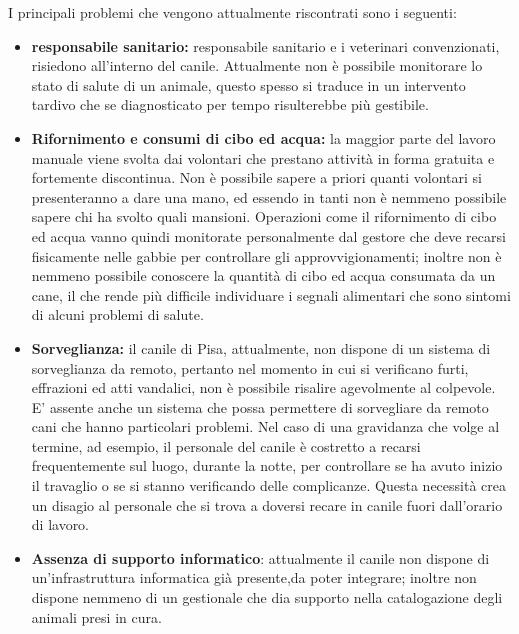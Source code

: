 I principali problemi che vengono attualmente riscontrati sono i seguenti:
\begin{itemize}
    \item \textbf{responsabile sanitario:} responsabile sanitario e i veterinari convenzionati, risiedono all'interno del canile.
    Attualmente non è possibile monitorare lo stato di salute di un animale, questo spesso si traduce in un intervento tardivo che se diagnosticato per tempo risulterebbe più gestibile.
    \item \textbf{Rifornimento e consumi di cibo ed acqua:} la maggior parte del lavoro manuale viene svolta dai volontari che prestano attività in forma gratuita e fortemente discontinua. Non è possibile sapere a priori quanti volontari si presenteranno a dare una mano, ed essendo in tanti non è nemmeno possibile sapere chi ha svolto quali mansioni. Operazioni come il rifornimento di cibo ed acqua vanno quindi monitorate personalmente dal gestore che deve recarsi fisicamente nelle gabbie per controllare gli approvvigionamenti; inoltre non è nemmeno possibile conoscere la quantità di cibo ed acqua consumata da un cane, il che rende più difficile individuare i segnali alimentari che sono sintomi di alcuni problemi di salute.
    \item \textbf{Sorveglianza:} il canile di Pisa, attualmente, non dispone di un sistema di sorveglianza da remoto, pertanto nel momento in cui si verificano furti, effrazioni ed atti vandalici, non è possibile risalire agevolmente al colpevole. E' assente anche un sistema che possa permettere di sorvegliare da remoto cani che hanno particolari problemi. Nel caso di una gravidanza che volge al termine, ad esempio, il personale del canile è costretto a recarsi frequentemente sul luogo, durante la notte, per controllare se ha avuto inizio il travaglio o se si stanno verificando delle complicanze. Questa necessità crea un disagio al personale che si trova a doversi recare in canile fuori dall'orario di lavoro.
    
    \item \textbf{Assenza di supporto informatico}: attualmente il canile non dispone di un'infrastruttura informatica già presente,da poter integrare; inoltre non dispone nemmeno di un gestionale che dia supporto nella catalogazione degli animali presi in cura.
\end{itemize}
 




